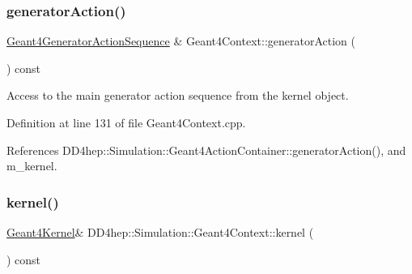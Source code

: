 \hypertarget{class_d_d4hep_1_1_simulation_1_1_geant4_context_a4c447bc986781e63d5942600fcd76ef2}{}\label{class_d_d4hep_1_1_simulation_1_1_geant4_context_a4c447bc986781e63d5942600fcd76ef2} 
\subsubsection{\texorpdfstring{generator\+Action()}{generatorAction()}}
{\footnotesize\ttfamily \hyperlink{class_d_d4hep_1_1_simulation_1_1_geant4_generator_action_sequence}{Geant4\+Generator\+Action\+Sequence} \& Geant4\+Context\+::generator\+Action (\begin{DoxyParamCaption}{ }\end{DoxyParamCaption}) const}



Access to the main generator action sequence from the kernel object. 



Definition at line 131 of file Geant4\+Context.\+cpp.



References D\+D4hep\+::\+Simulation\+::\+Geant4\+Action\+Container\+::generator\+Action(), and m\+\_\+kernel.

\hypertarget{class_d_d4hep_1_1_simulation_1_1_geant4_context_a4374827bf9949372b0e79fb952b186d7}{}\label{class_d_d4hep_1_1_simulation_1_1_geant4_context_a4374827bf9949372b0e79fb952b186d7} 
\subsubsection{\texorpdfstring{kernel()}{kernel()}}
{\footnotesize\ttfamily \hyperlink{class_d_d4hep_1_1_simulation_1_1_geant4_kernel}{Geant4\+Kernel}\& D\+D4hep\+::\+Simulation\+::\+Geant4\+Context\+::kernel (\begin{DoxyParamCaption}{ }\end{DoxyParamCaption}) const\hspace{0.3cm}{\ttfamily [inline]}}



